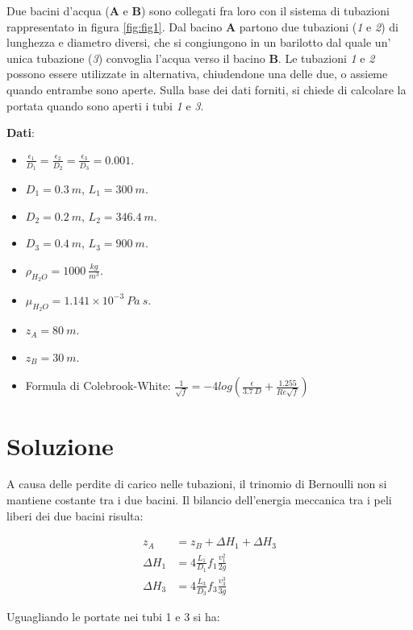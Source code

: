 \documentclass[oneside]{article}
\begin{document}
Due bacini d’acqua (\textbf{A} e \textbf{B}) sono collegati fra loro con il sistema di
tubazioni rappresentato in figura \ref{fig:fig1}. Dal bacino \textbf{A} partono due
tubazioni (\textit{1} e \textit{2}) di lunghezza e diametro diversi, che si congiungono
in un barilotto dal quale un' unica tubazione (\textit{3}) convoglia l’acqua verso il
bacino \textbf{B}. Le tubazioni \textit{1} e \textit{2} possono essere utilizzate in
alternativa, chiudendone una delle due, o assieme quando entrambe sono aperte. Sulla base
dei dati forniti, si chiede di calcolare la portata quando sono aperti i tubi \textit{1}
e \textit{3}.

\noindent \textbf{Dati}:
\begin{itemize}
   \item $\frac{\epsilon_{1}}{D_1} = \frac{\epsilon_{2}}{D_2} = \frac{\epsilon_{3}}{D_3}
      = 0.001$.
   \item $D_1 = 0.3 \: m$, $L_1 = 300 \: m$.
   \item $D_2 = 0.2 \: m$, $L_2 = 346.4 \: m$.
   \item $D_3 = 0.4 \: m$, $L_3 = 900 \: m$.
   \item $\rho_{H_{2}O} = 1000 \: \frac{kg}{m^3}$.
   \item $\mu_{H_{2}O} = 1.141 \times 10^{-3} \: Pa \: s$.
   \item $z_A = 80 \: m$.
   \item $z_B = 30 \: m$.
   \item Formula di Colebrook-White: $\frac{1}{\sqrt{f}} = -4
      log\left(\frac{\epsilon}{3.7 \: D} + \frac{1.255}{Re \sqrt{f}}\right)$
\end{itemize}

\section*{Soluzione}
A causa delle perdite di carico nelle tubazioni, il trinomio di Bernoulli non si mantiene costante tra i due bacini.
Il bilancio dell’energia meccanica tra i peli liberi dei due bacini risulta:

\begin{align}
   z_A &= z_B + \Delta H_1 + \Delta H_3 \\
   \Delta H_1 &= 4 \frac{L_1}{D_1} f_1 \frac{v_{1}^{2}}{2g} \\
   \Delta H_3 &= 4 \frac{L_3}{D_3} f_3 \frac{v_{3}^{3}}{3g}
\end{align}

Uguagliando le portate nei tubi 1 e 3 si ha:
\end{document}
